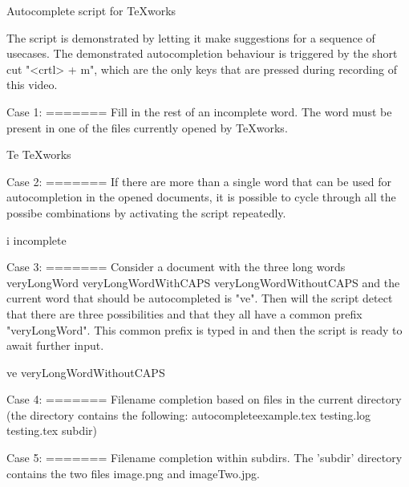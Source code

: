 Autocomplete script for TeXworks

The script is demonstrated by letting it make suggestions
for a sequence of usecases.
The demonstrated autocompletion behaviour is triggered by the
short cut "<crtl> + m", which are the only keys that are 
pressed during recording of this video.












Case 1:
=======
Fill in the rest of an incomplete word. The word must be 
present in one of the files currently opened by TeXworks.

Te
TeXworks












Case 2:
=======
If there are more than a single word that can be used for 
autocompletion in the opened documents, it is possible to 
cycle through all the possibe combinations by activating 
the script repeatedly.

i
incomplete










Case 3:
=======
Consider a document with the three long words
veryLongWord
veryLongWordWithCAPS
veryLongWordWithoutCAPS
and the current word that should be autocompleted is "ve".
Then will the script detect that there are three 
possibilities and that they all have a common prefix 
"veryLongWord". This common prefix is typed in and then the 
script is ready to await further input.

ve
veryLongWordWithoutCAPS





Case 4: 
=======
Filename completion based on files in the current directory
(the directory contains the following: 
autocompleteexample.tex
testing.log
testing.tex
subdir)











Case 5: 
=======
Filename completion within subdirs.
The 'subdir' directory contains the two files
image.png and imageTwo.jpg.


